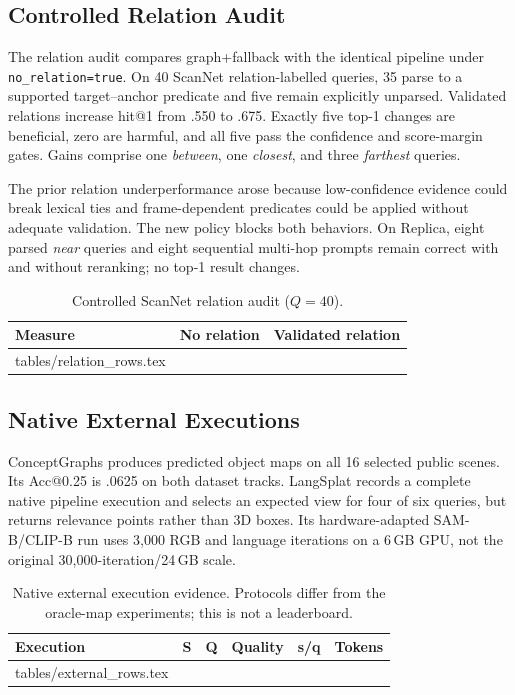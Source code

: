 \documentclass[10pt,twocolumn,letterpaper]{article}
\makeatletter
\newcommand{\tableinput}[1]{\@@input #1 }
\newcommand{\tableformat}{%
  \renewcommand{\arraystretch}{1.10}%
  \setlength{\tabcolsep}{4pt}%
}
\makeatother
\begin{document}
\subsection{Controlled Relation Audit}
The relation audit compares graph+fallback with the identical pipeline under
\texttt{no\_relation=true}. On 40 ScanNet relation-labelled queries, 35 parse
to a supported target--anchor predicate and five remain explicitly unparsed.
Validated relations increase hit@1 from .550 to .675. Exactly five top-1
changes are beneficial, zero are harmful, and all five pass the confidence and
score-margin gates. Gains comprise one \emph{between}, one \emph{closest}, and
three \emph{farthest} queries.

The prior relation underperformance arose because low-confidence evidence
could break lexical ties and frame-dependent predicates could be applied
without adequate validation. The new policy blocks both behaviors. On Replica,
eight parsed \emph{near} queries and eight sequential multi-hop prompts remain
correct with and without reranking; no top-1 result changes.

\begin{table}[t]
\centering
\caption{Controlled ScanNet relation audit ($Q=40$).}
\label{tab:relation}
\small
\tableformat
\begin{tabular}{@{}lrr@{}}
\toprule
\textbf{Measure} & \textbf{No relation} & \textbf{Validated relation} \\
\midrule
\tableinput{tables/relation_rows.tex}
\bottomrule
\end{tabular}
\end{table}

\subsection{Native External Executions}
ConceptGraphs produces predicted object maps on all 16 selected public scenes.
Its Acc@0.25 is .0625 on both dataset tracks. LangSplat records a complete native pipeline execution
and selects an expected view for four of six queries, but returns
relevance points rather than 3D boxes. Its hardware-adapted SAM-B/CLIP-B run
uses 3,000 RGB and language iterations on a 6\,GB GPU, not the original
30,000-iteration/24\,GB scale.

\begin{table}[t]
\centering
\caption{Native external execution evidence. Protocols differ from the
oracle-map experiments; this is not a leaderboard.}
\label{tab:external}
\footnotesize
\tableformat
\begin{tabular}{@{}lrrrrr@{}}
\toprule
\textbf{Execution} & \textbf{S} & \textbf{Q} & \textbf{Quality} &
\textbf{s/q} & \textbf{Tokens} \\
\midrule
\tableinput{tables/external_rows.tex}
\bottomrule
\end{tabular}
\end{table}
\end{document}
